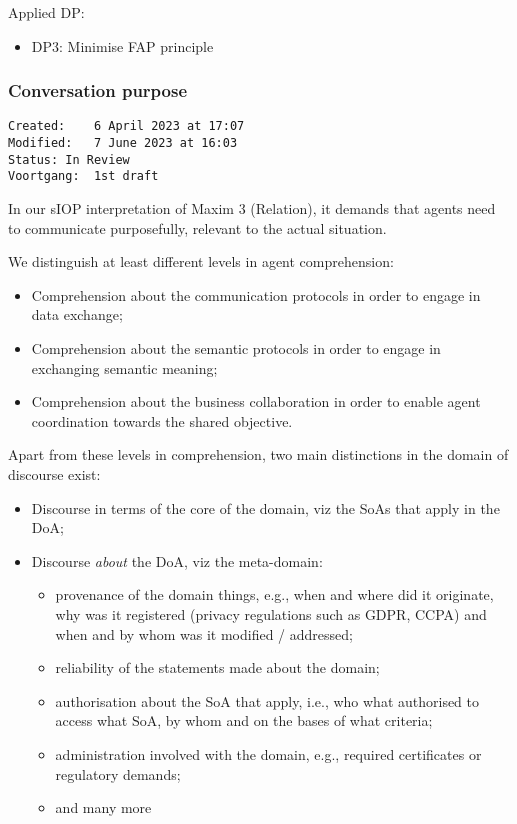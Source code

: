 \documentclass[sort&compress,preprint,3p,authoryear,twocolumn]{elsarticle}
\providecommand{\tightlist}{%
  \setlength{\itemsep}{0pt}\setlength{\parskip}{0pt}}
\theoremstyle{break}			%
\begin{document}
Applied DP:

\begin{itemize}
\tightlist
\item
  DP3: Minimise FAP principle
\end{itemize}

\subsubsection{Conversation purpose}\label{conversation-purpose}

\begin{verbatim}
Created:    6 April 2023 at 17:07
Modified:   7 June 2023 at 16:03
Status: In Review
Voortgang:  1st draft
\end{verbatim}

In our sIOP interpretation of Maxim 3 (Relation), it demands that agents
need to communicate purposefully, relevant to the actual situation.

We distinguish at least different levels in agent comprehension:

\begin{itemize}
\tightlist
\item
  Comprehension about the communication protocols in order to engage in
  data exchange;
\item
  Comprehension about the semantic protocols in order to engage in
  exchanging semantic meaning;
\item
  Comprehension about the business collaboration in order to enable
  agent coordination towards the shared objective.
\end{itemize}

Apart from these levels in comprehension, two main distinctions in the
domain of discourse exist:

\begin{itemize}
\tightlist
\item
  Discourse in terms of the core of the domain, viz the SoAs that apply
  in the DoA;
\item
  Discourse \emph{about} the DoA, viz the meta-domain:

  \begin{itemize}
  \tightlist
  \item
    provenance of the domain things, e.g., when and where did it
    originate, why was it registered (privacy regulations such as GDPR,
    CCPA) and when and by whom was it modified / addressed;
  \item
    reliability of the statements made about the domain;
  \item
    authorisation about the SoA that apply, i.e., who what authorised to
    access what SoA, by whom and on the bases of what criteria;
  \item
    administration involved with the domain, e.g., required certificates
    or regulatory demands;
  \item
    and many more
  \end{itemize}
\end{itemize}
\end{document}
